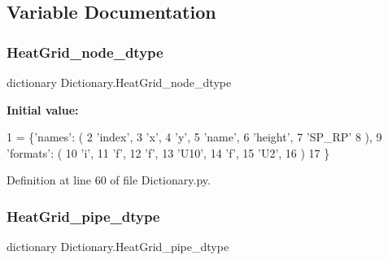 \subsection{Variable Documentation}
\mbox{\label{namespace_dictionary_a302fe29521940f3c902f1d1be3652eea}} 
\subsubsection{\texorpdfstring{Heat\+Grid\+\_\+node\+\_\+dtype}{HeatGrid\_node\_dtype}}
{\footnotesize\ttfamily dictionary Dictionary.\+Heat\+Grid\+\_\+node\+\_\+dtype}

{\bfseries Initial value\+:}
\begin{DoxyCode}
1 =     \{\textcolor{stringliteral}{'names'}: (
2                                 \textcolor{stringliteral}{'index'},
3                                 \textcolor{stringliteral}{'x'},
4                                 \textcolor{stringliteral}{'y'},
5                                 \textcolor{stringliteral}{'name'},
6                                 \textcolor{stringliteral}{'height'},
7                                 \textcolor{stringliteral}{'SP\_RP'}
8                                 ),
9                        \textcolor{stringliteral}{'formats'}: (
10                                 \textcolor{stringliteral}{'i'},
11                                 \textcolor{stringliteral}{'f'},
12                                 \textcolor{stringliteral}{'f'},
13                                 \textcolor{stringliteral}{'U10'},
14                                 \textcolor{stringliteral}{'f'},
15                                 \textcolor{stringliteral}{'U2'},
16                                 )
17                                \}
\end{DoxyCode}


Definition at line 60 of file Dictionary.\+py.

\mbox{\label{namespace_dictionary_a81817c3683d83c45721baf9ac7a0f324}} 
\subsubsection{\texorpdfstring{Heat\+Grid\+\_\+pipe\+\_\+dtype}{HeatGrid\_pipe\_dtype}}
{\footnotesize\ttfamily dictionary Dictionary.\+Heat\+Grid\+\_\+pipe\+\_\+dtype}



